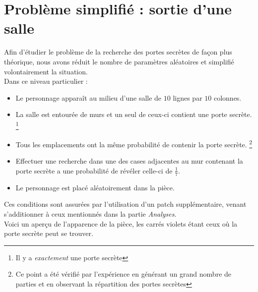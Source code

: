 \documentclass[a4paper,12pt]{article}
\begin{document}
\section{Problème simplifié : sortie d'une salle}

Afin d'étudier le problème de la recherche des portes secrètes de façon plus
théorique, nous avons réduit le nombre de paramètres aléatoires et simplifié
volontairement la situation.
\\
Dans ce niveau particulier :
\begin{itemize}
\item Le personnage apparaît au milieu d'une salle de $10$ lignes par $10$
  colonnes.
\item La salle est entourée de murs et un seul de ceux-ci contient une porte
  secrète.
  \footnote{Il y a {\em exactement} une porte secrète}
\item Tous les emplacements ont la même probabilité de contenir la porte
  secrète.
  \footnote{Ce point a été vérifié par l'expérience en générant un grand nombre
    de parties et en observant la répartition des portes secrètes}
\item Effectuer une recherche dans une des cases adjacentes au mur contenant la
  porte secrète a une probabilité de révéler celle-ci de $\frac{1}{7}$.
\item Le personnage est placé aléatoirement dans la pièce.
\end{itemize}

Ces conditions sont assurées par l'utilisation d'un patch supplémentaire, venant
s'additionner à ceux mentionnés dans la partie {\em Analyses}.
\\
Voici un aperçu de l'apparence de la pièce, les carrés violets étant ceux où la
porte secrète peut se trouver.

\begin{center}
\end{center}
\end{document}
